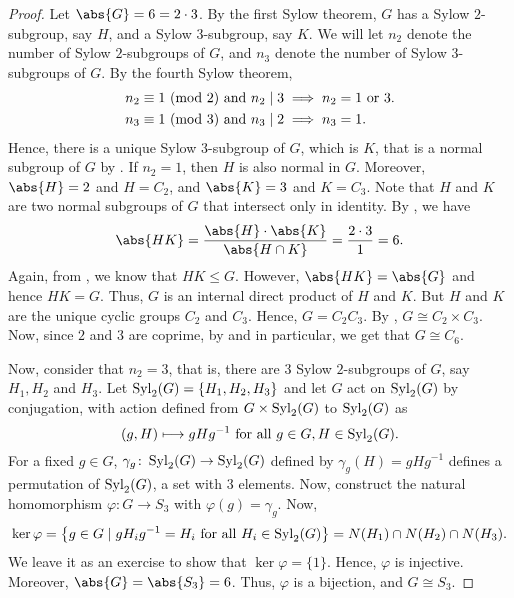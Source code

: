 \begin{proof}
    Let $\abs{G} = 6 = 2 \cdot 3$. By the first Sylow theorem, $G$ has a Sylow $2$-subgroup, say $H$, and a Sylow $3$-subgroup, say $K$. We will let $n_2$ denote the number of Sylow $2$-subgroups of $G$, and $n_3$ denote the number of Sylow $3$-subgroups of $G$. By the fourth Sylow theorem,
    \begin{align*}
        n_2 &\equiv 1 \ (\mathrm{mod}\ 2) \text{ and } n_2 \mid 3 \implies n_2 = 1 \text{ or } 3. \\
        n_3 &\equiv 1 \ (\mathrm{mod}\ 3) \text{ and } n_3 \mid 2 \implies n_3 = 1.
    \end{align*}
    Hence, there is a unique Sylow $3$-subgroup of $G$, which is $K$, that is a normal subgroup of $G$ by . If $n_2 = 1$, then $H$ is also normal in $G$. Moreover, $\abs{H} = 2$ and $H = C_2$, and $\abs{K} = 3$ and $K = C_3$. Note that $H$ and $K$ are two normal subgroups of $G$ that intersect only in identity. By , we have
    \[
        \abs{HK} = \frac{\abs{H} \cdot \abs{K}}{\abs{H \cap K}} = \frac{2 \cdot 3}{1} = 6.
    \]
    Again, from , we know that $HK \leq G$. However, $\abs{HK} = \abs{G}$ and hence $HK = G$. Thus, $G$ is an internal direct product of $H$ and $K$. But $H$ and $K$ are the unique cyclic groups $C_2$ and $C_3$. Hence, $G = C_2 C_3$. By , $G \cong C_2 \times C_3$. Now, since $2$ and $3$ are coprime, by  and  in particular, we get that $G \cong C_6$.
    
    Now, consider that $n_2 = 3$, that is, there are $3$ Sylow $2$-subgroups of $G$, say $H_1, H_2$ and $H_3$. Let $\operatorname{Syl}_2(G) = \left\{ H_1, H_2, H_3 \right\}$ and let $G$ act on $\operatorname{Syl}_2(G)$ by conjugation, with action defined from $G \times \operatorname{Syl}_2(G)$ to $\operatorname{Syl}_2(G)$ as
    \[
        (g,H) \longmapsto gHg^{-1} \text{ for all } g \in G, H \in \operatorname{Syl}_2(G).
    \]
    For a fixed $g \in G$, $\gamma_g \colon \operatorname{Syl}_2(G) \to \operatorname{Syl}_2(G)$ defined by $\gamma_g(H) = gHg^{-1}$ defines a permutation of $\operatorname{Syl}_2(G)$, a set with $3$ elements. Now, construct the natural homomorphism $\varphi \colon G \to S_3$ with $\varphi(g) = \gamma_g$. Now, 
    \[
        \ker\varphi = \left\{ g \in G \mid gH_ig^{-1} = H_i \text{ for all } H_i \in \operatorname{Syl}_2(G) \right\} = N(H_1) \cap N(H_2) \cap N(H_3).
    \]
    We leave it as an exercise to show that $\ker\varphi = \{1\}$. Hence, $\varphi$ is injective. Moreover, $\abs{G} = \abs{S_3} = 6$. Thus, $\varphi$ is a bijection, and $G \cong S_3$. 
\end{proof}

